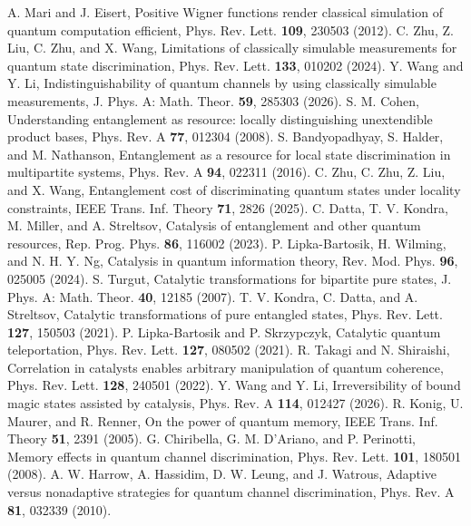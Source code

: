 \documentclass[aps,pra,twocolumn,floatfix,amsfonts,10pt]{revtex4-2}
\begin{document}
\begin{thebibliography}{}
	A. Mari and J. Eisert, Positive Wigner functions render classical simulation of quantum computation efficient, Phys. Rev. Lett. \textbf{109}, 230503 (2012).
	C. Zhu, Z. Liu, C. Zhu, and X. Wang, Limitations of classically simulable measurements for quantum state discrimination, Phys. Rev. Lett. \textbf{133}, 010202 (2024).
	Y. Wang and Y. Li, Indistinguishability of quantum channels by using classically simulable measurements, J. Phys. A: Math. Theor. \textbf{59}, 285303 (2026).
	S. M. Cohen, Understanding entanglement as resource: locally distinguishing unextendible product bases, Phys. Rev. A \textbf{77}, 012304 (2008).
	S. Bandyopadhyay, S. Halder, and M. Nathanson, Entanglement as a resource for local state discrimination in multipartite systems, Phys. Rev. A \textbf{94}, 022311 (2016).
	C. Zhu, C. Zhu, Z. Liu, and X. Wang, Entanglement cost of discriminating quantum states under locality constraints, IEEE Trans. Inf. Theory \textbf{71}, 2826 (2025).
	C. Datta, T. V. Kondra, M. Miller, and A. Streltsov, Catalysis of entanglement and other quantum resources, Rep. Prog. Phys. \textbf{86}, 116002 (2023).
	P. Lipka-Bartosik, H. Wilming, and N. H. Y. Ng, Catalysis in quantum information theory, Rev. Mod. Phys. \textbf{96}, 025005 (2024).
	S. Turgut, Catalytic transformations for bipartite pure states, J. Phys. A: Math. Theor. \textbf{40}, 12185 (2007).
	T. V. Kondra, C. Datta, and A. Streltsov, Catalytic transformations of pure entangled states, Phys. Rev. Lett. \textbf{127}, 150503 (2021).
	P. Lipka-Bartosik and P. Skrzypczyk, Catalytic quantum teleportation, Phys. Rev. Lett. \textbf{127}, 080502 (2021).
	R. Takagi and N. Shiraishi, Correlation in catalysts enables arbitrary manipulation of quantum coherence, Phys. Rev. Lett. \textbf{128}, 240501 (2022).
	Y. Wang and Y. Li, Irreversibility of bound magic states assisted by catalysis, Phys. Rev. A \textbf{114}, 012427 (2026).
	R. Konig, U. Maurer, and R. Renner, On the power of quantum memory, IEEE Trans. Inf. Theory \textbf{51}, 2391 (2005).
	G. Chiribella, G. M. D’Ariano, and P. Perinotti, Memory effects in quantum channel discrimination, Phys. Rev. Lett. \textbf{101}, 180501 (2008).
	A. W. Harrow, A. Hassidim, D. W. Leung, and J. Watrous, Adaptive versus nonadaptive strategies for quantum channel discrimination, Phys. Rev. A \textbf{81}, 032339 (2010).

\end{thebibliography}
\end{document}
